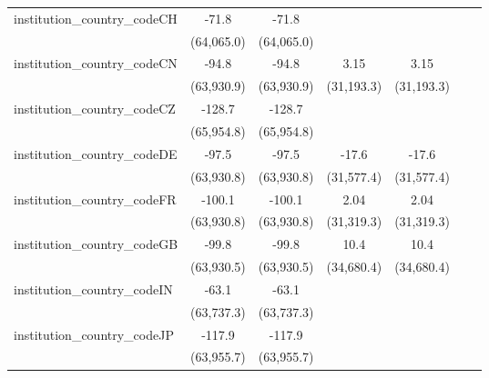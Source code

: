 \begin{tabular}{lcccccc}
   institution\_country\_codeCH          & -71.8        & -71.8        &             &             &                &   \\   
                                         & (64,065.0)   & (64,065.0)   &             &             &                &   \\   
   institution\_country\_codeCN          & -94.8        & -94.8        & 3.15        & 3.15        &                &   \\   
                                         & (63,930.9)   & (63,930.9)   & (31,193.3)  & (31,193.3)  &                &   \\   
   institution\_country\_codeCZ          & -128.7       & -128.7       &             &             &                &   \\   
                                         & (65,954.8)   & (65,954.8)   &             &             &                &   \\   
   institution\_country\_codeDE          & -97.5        & -97.5        & -17.6       & -17.6       &                &   \\   
                                         & (63,930.8)   & (63,930.8)   & (31,577.4)  & (31,577.4)  &                &   \\   
   institution\_country\_codeFR          & -100.1       & -100.1       & 2.04        & 2.04        &                &   \\   
                                         & (63,930.8)   & (63,930.8)   & (31,319.3)  & (31,319.3)  &                &   \\   
   institution\_country\_codeGB          & -99.8        & -99.8        & 10.4        & 10.4        &                &   \\   
                                         & (63,930.5)   & (63,930.5)   & (34,680.4)  & (34,680.4)  &                &   \\   
   institution\_country\_codeIN          & -63.1        & -63.1        &             &             &                &   \\   
                                         & (63,737.3)   & (63,737.3)   &             &             &                &   \\   
   institution\_country\_codeJP          & -117.9       & -117.9       &             &             &                &   \\   
                                         & (63,955.7)   & (63,955.7)   &             &             &                &   \\   

\end{tabular}
